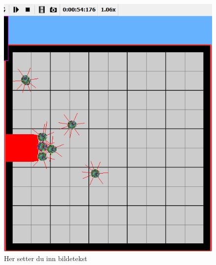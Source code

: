 \documentclass[titlepage,norsk,a4paper,10pt]{article}
\begin{document}






\begin{figure}[p]
\centering
\includegraphics[scale=0.5]{figs/observation2}
\caption{Her setter du inn bildetekst}
\label{fig:02}
\end{figure}
\end{document}
